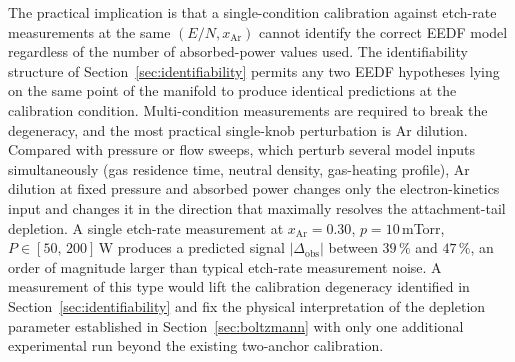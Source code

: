 The practical implication is that a single-condition calibration
against etch-rate measurements at the same
$(E/N, x_{\mathrm{Ar}})$ cannot identify the correct EEDF model
regardless of the number of absorbed-power values used. The
identifiability structure of
Section~\ref{sec:identifiability} permits any two EEDF hypotheses
lying on the same point of the manifold to produce identical
predictions at the calibration condition. Multi-condition
measurements are required to break the degeneracy, and the most
practical single-knob perturbation is Ar dilution. Compared with
pressure or flow sweeps, which perturb several model inputs
simultaneously (gas residence time, neutral density, gas-heating
profile), Ar dilution at fixed pressure and absorbed power changes
only the electron-kinetics input and changes it in the direction
that maximally resolves the attachment-tail depletion. A single
etch-rate measurement at $x_{\mathrm{Ar}} = 0.30$,
$p = 10\,$mTorr, $P \in [50,\,200]\,$W produces a predicted signal
$|\Delta_{\mathrm{obs}}|$ between $39\,\%$ and $47\,\%$, an order
of magnitude larger than typical etch-rate measurement noise. A
measurement of this type would lift the calibration degeneracy
identified in Section~\ref{sec:identifiability} and fix the
physical interpretation of the depletion parameter established in
Section~\ref{sec:boltzmann} with only one additional experimental
run beyond the existing two-anchor calibration.
